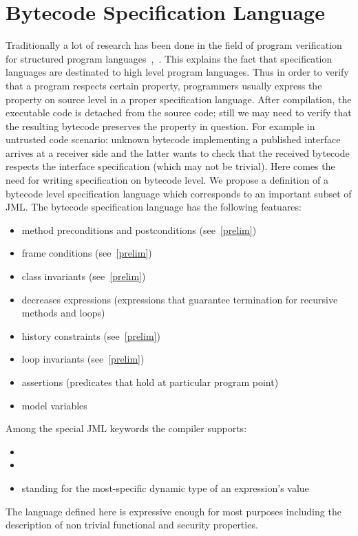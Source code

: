 
\section{Bytecode Specification Language}\label{bcSpecLg}
Traditionally a lot of research has been done in the field of program verification for structured program languages~\cite{WPCDS},~\cite{DisDij}. This explains the fact that specification languages are destinated to high level program languages. Thus in order to verify that a program respects certain property, programmers usually express the property on source level in a proper specification language.
After compilation, the executable code is detached from the source code; still we may need to verify that the resulting bytecode preserves the property in question. For example in untrusted code scenario: unknown bytecode implementing a published interface arrives at a receiver side and the latter wants to check that the received bytecode respects the interface specification (which may not be trivial). Here comes the need for writing specification on bytecode level. We propose a definition of a bytecode level specification language which corresponds to an important subset of JML.
The bytecode specification language has the following featuares: 
\begin{itemize} 
	\item method preconditions and postconditions (see~\ref{prelim})
	\item frame conditions (see~\ref{prelim})
	\item class invariants  (see~\ref{prelim})
	\item decreases expressions (expressions that guarantee termination for recursive methods and loops)
	\item history constraints (see~\ref{prelim})
	\item loop invariants (see~\ref{prelim})
	\item assertions (predicates that hold at particular program point)
	\item model variables  
\end{itemize}

Among the special JML keywords the compiler supports:
\begin{itemize} 
	\item {}  
	\item {}
	\item {} standing for the most-specific dynamic type of an expression's value
\end{itemize}
 The language defined here is expressive enough for most purposes including the description of non trivial functional and security properties.


